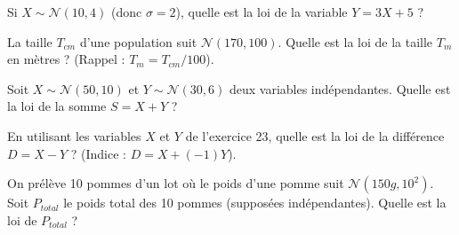
\begin{exercicebox}
Si $X \sim \mathcal{N}(10, 4)$ (donc $\sigma=2$), quelle est la loi de la variable $Y = 3X + 5$ ?
\end{exercicebox}

\begin{exercicebox}
La taille $T_{cm}$ d'une population suit $\mathcal{N}(170, 100)$. Quelle est la loi de la taille $T_{m}$ en mètres ? (Rappel : $T_{m} = T_{cm} / 100$).
\end{exercicebox}

\begin{exercicebox}
Soit $X \sim \mathcal{N}(50, 10)$ et $Y \sim \mathcal{N}(30, 6)$ deux variables indépendantes.
Quelle est la loi de la somme $S = X + Y$ ?
\end{exercicebox}

\begin{exercicebox}
En utilisant les variables $X$ et $Y$ de l'exercice 23, quelle est la loi de la différence $D = X - Y$ ?
(Indice : $D = X + (-1)Y$).
\end{exercicebox}

\begin{exercicebox}
On prélève 10 pommes d'un lot où le poids d'une pomme suit $\mathcal{N}(150g, 10^2)$. Soit $P_{total}$ le poids total des 10 pommes (supposées indépendantes).
Quelle est la loi de $P_{total}$ ?
\end{exercicebox}